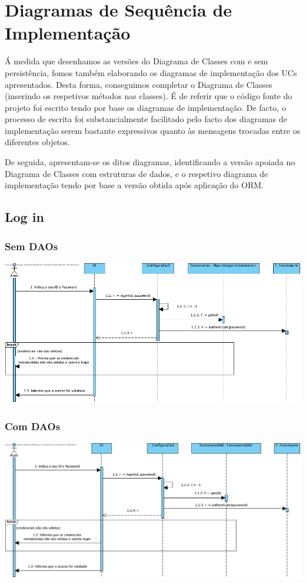 \section{Diagramas de Sequência de Implementação}
Á medida que desenhamos as versões do Diagrama de Classes com e sem persistência, fomos também elaborando os diagramas de implementação dos UCs apresentados. Desta forma, conseguimos completar o Diagrama de Classes (inserindo os respetivos métodos nas classes). É de referir que o código fonte do projeto foi escrito tendo por base os diagramas de implementação. De facto, o processo de escrita foi substancialmente facilitado pelo facto dos diagramas de implementação serem bastante expressivos quanto às mensagens trocadas entre os diferentes objetos.

De seguida, apresentam-se os ditos diagramas, identificando a versão apoiada no Diagrama de Classes com estruturas de dados, e o respetivo diagrama de implementação tendo por base a versão obtida após aplicação do ORM.

\subsection{Log in}
\subsubsection{Sem DAOs}
\begin{center}
 	\includegraphics[width = 5.5in]{DSI/DSI-LogIn.jpg}
\end{center}
\subsubsection{Com DAOs}
\begin{center}
 	\includegraphics[width = 5.5in]{DSI_D/DSI-DAOs-Log_In.jpg}
\end{center}



